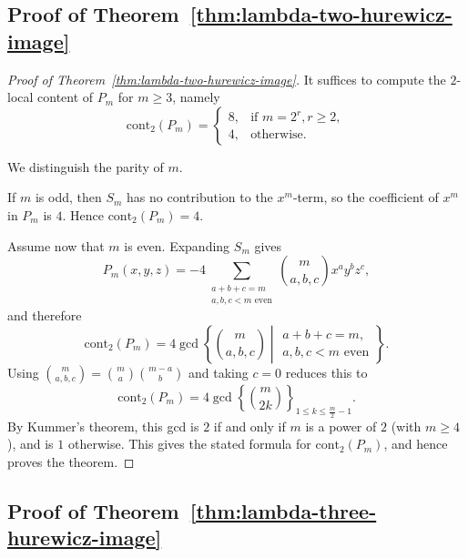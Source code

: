 \documentclass[a4paper]{amsart}
\theoremstyle{plain}
\theoremstyle{definition}
\newcommand{\cont}{\mathrm{cont}}
\renewcommand{\le}{\leqslant}
\renewcommand{\ge}{\geqslant}
\begin{document}
\subsection{Proof of Theorem~\ref{thm:lambda-two-hurewicz-image}}

\begin{proof}[Proof of Theorem~\ref{thm:lambda-two-hurewicz-image}]
	It suffices to compute the $2$-local content of $P_m$ for $m\ge 3$, namely
	\[
		\cont_2(P_m)=
		\begin{cases}
			8, & \text{if }m=2^{r}, r\ge 2, \\
			4, & \text{otherwise}.
		\end{cases}
	\]

	We distinguish the parity of $m$.

	If $m$ is odd, then $S_m$ has no contribution to the $x^m$-term, so the coefficient of $x^m$ in $P_m$ is $4$. Hence $\cont_2(P_m)=4$.

	Assume now that $m$ is even. Expanding $S_m$ gives
	\[
		P_m(x,y,z)=-4  \sum_{\substack{a+b+c=m\\ a,b,c < m \text{ even}}}  \binom{m}{a,b,c} x^{a}y^{b}z^{c},
	\]
	and therefore
	\[
		\cont_2(P_m)
		=
		4\gcd\left\{\binom{m}{a,b,c} \middle| \substack{a+b+c=m,\\ a,b,c<m \text{ even}}\right\}.
	\]
	Using $\binom{m}{a,b,c}=\binom{m}{a}\binom{m-a}{b}$ and taking $c=0$ reduces this to
	\[
		\cont_2(P_m)=4\gcd\left\{\binom{m}{2k}\right\}_{1\le k\le \frac{m}{2}-1}.
	\]
	By Kummer's theorem, this gcd is $2$ if and only if $m$ is a power of $2$ (with $m\ge 4$), and is $1$ otherwise.
	This gives the stated formula for $\cont_2(P_m)$, and hence proves the theorem.
\end{proof}

\subsection{Proof of Theorem~\ref{thm:lambda-three-hurewicz-image}}
\end{document}
